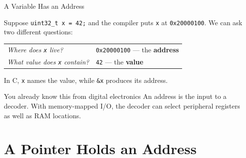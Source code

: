 \documentclass[9pt,aspectratio=169,xcolor=table]{beamer}
\begin{document}
\begin{frame}{A Variable Has an Address}
	\leavevmode

	Suppose \texttt{uint32\_t x = 42;} and the compiler puts \texttt{x} at
	\texttt{0x20000100}. We can ask two different questions:

	\vspace{3mm}
	\begin{center}
		{\small
			\begin{tabular}{@{}ll@{}}
				\emph{Where does \texttt{x} live?}
				& \texttt{0x20000100} --- the \textbf{address} \\[1mm]
				\emph{What value does \texttt{x} contain?}
				& \texttt{42} --- the \textbf{value}
		\end{tabular}}
	\end{center}

	\vspace{3mm}
	{
		In C, \texttt{x} names the value, while \texttt{\&x} produces its
		address.
	}
    \vspace{3mm}
	\begin{block}{You already know this from digital electronics}
		An address is the input to a
		\alert{decoder}. With memory-mapped I/O, the decoder can select
		peripheral registers as well as RAM locations.
	\end{block}

\end{frame}

\section{A Pointer Holds an Address}
\end{document}
